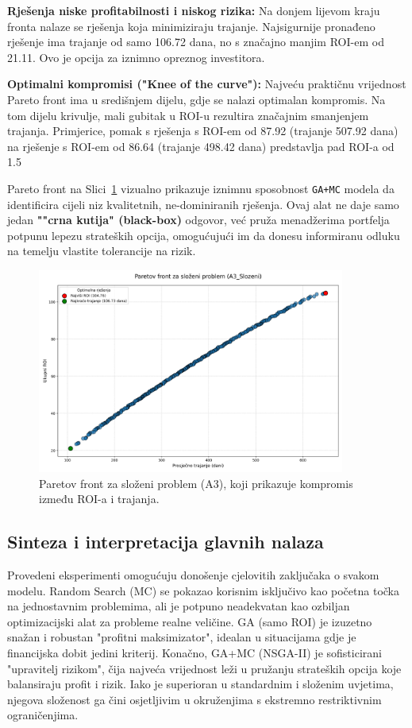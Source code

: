 \textbf{Rješenja niske profitabilnosti i niskog rizika:} Na donjem lijevom kraju fronta nalaze se rješenja koja minimiziraju trajanje. Najsigurnije pronađeno rješenje ima trajanje od samo 106.72 dana, no s značajno manjim ROI-em od 21.11. Ovo je opcija za iznimno opreznog investitora.

\textbf{Optimalni kompromisi ("Knee of the curve"):} Najveću praktičnu vrijednost Pareto front ima u središnjem dijelu, gdje se nalazi optimalan kompromis. Na tom dijelu krivulje, mali gubitak u ROI-u rezultira značajnim smanjenjem trajanja. Primjerice, pomak s rješenja s ROI-em od 87.92 (trajanje 507.92 dana) na rješenje s ROI-em od 86.64 (trajanje 498.42 dana) predstavlja pad ROI-a od 1.5%

Pareto front na Slici~\ref{fig:pareto_front} vizualno prikazuje iznimnu sposobnost \texttt{GA+MC} modela da identificira cijeli niz kvalitetnih, ne-dominiranih rješenja. Ovaj alat ne daje samo jedan \textbf{""crna kutija" (black-box)} odgovor, već pruža menadžerima portfelja potpunu lepezu strateških opcija, omogućujući im da donesu informiranu odluku na temelju vlastite tolerancije na rizik.

\begin{figure}[H]
    \centering
    \includegraphics[width=0.9\textwidth]{slike/grafikoni_final/D_pareto_front_scatter.png}
    \caption{Paretov front za složeni problem (A3), koji prikazuje kompromis između ROI-a i trajanja.}
    \label{fig:pareto_front}
\end{figure}

\subsection{Sinteza i interpretacija glavnih nalaza}
Provedeni eksperimenti omogućuju donošenje cjelovitih zaključaka o svakom modelu. Random Search (MC) se pokazao korisnim isključivo kao početna točka na jednostavnim problemima, ali je potpuno neadekvatan kao ozbiljan optimizacijski alat za probleme realne veličine. GA (samo ROI) je izuzetno snažan i robustan "profitni maksimizator", idealan u situacijama gdje je financijska dobit jedini kriterij. Konačno, GA+MC (NSGA-II) je sofisticirani "upravitelj rizikom", čija najveća vrijednost leži u pružanju strateških opcija koje balansiraju profit i rizik. Iako je superioran u standardnim i složenim uvjetima, njegova složenost ga čini osjetljivim u okruženjima s ekstremno restriktivnim ograničenjima.

